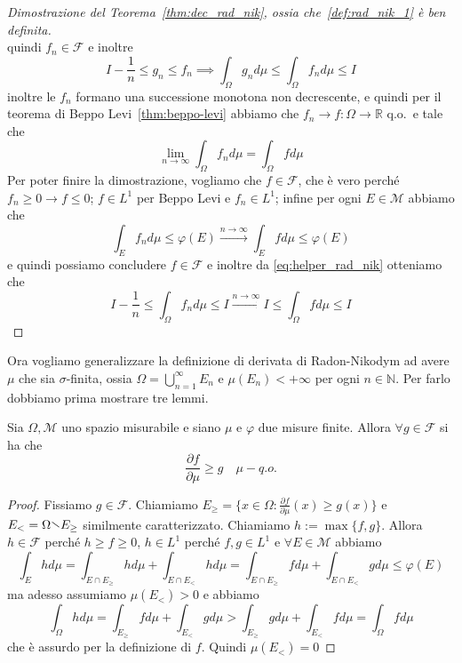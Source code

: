 \begin{proof}[Dimostrazione del Teorema~\ref{thm:dec_rad_nik}, ossia
    che~\ref{def:rad_nik_1} è ben definita]
\[    \]
    quindi \(f_{n} \in \mathcal{F}\) e inoltre 
    \begin{equation}\label{eq:helper_rad_nik}
        I - \frac{1}{n} \le g_{n} \le f_{n} \implies \int_\Omega g_{n} d\mu \le \int_\Omega f_{n}
        d\mu \le I
    \end{equation}
    inoltre le \(f_{n}\) formano una successione monotona non decrescente, e
    quindi per il teorema di Beppo Levi~\ref{thm:beppo-levi} abbiamo che \(f_{n}
    \to f : \Omega \to \mathbb{R}\) q.o.~e tale che 
    \[
        \lim_{n \to \infty} \int_\Omega f_{n} d\mu = \int_\Omega f d\mu
    \]
    Per poter finire la dimostrazione, vogliamo che \(f \in \mathcal{F}\), che è
    vero perché \(f_{n} \ge 0 \to f \le 0\); \(f \in L^{1}\) per Beppo Levi e
    \(f_{n} \in L^{1}\); infine per ogni \(E \in \mathcal{M}\) abbiamo che
    \[
        \int_E f_{n} d\mu \le \varphi {(E)} \overset{n \to
        \infty}{\longrightarrow} \int_E f d\mu \le \varphi {(E)}
    \]
    e quindi possiamo concludere \(f \in \mathcal{F}\) e inoltre da
    \eqref{eq:helper_rad_nik} otteniamo che
    \[
        I - \frac{1}{n} \le \int_\Omega f_{n} d\mu \le I
        \overset{n \to \infty}{\longrightarrow}I \le \int_\Omega f d\mu \le I
    \]
\end{proof}
Ora vogliamo generalizzare la definizione di derivata di Radon-Nikodym ad avere
\(\mu\) che sia \(\sigma\)-finita, ossia \(\Omega = \bigcup_{n=1}^{\infty}
E_{n}\) e \(\mu(E_{n}) < +\infty\) per ogni \(n \in \mathbb{N}\). Per farlo
dobbiamo prima mostrare tre lemmi.
\begin{lemma}\label{lem:rad_nik_1}
    Sia \(\Omega, \mathcal{M}\) uno spazio misurabile e siano \(\mu\) e
    \(\varphi \) due misure finite. Allora \(\forall g \in \mathcal{F}\) si ha
    che
    \[
        \frac{\partial f}{\partial \mu} \ge g \quad \mu-q.o.
    \]
\end{lemma}
\begin{proof}
    Fissiamo \(g \in \mathcal{F}\). Chiamiamo \(E_{\ge } = \{x \in \Omega :
    \frac{\partial f}{\partial \mu} {(x )} \ge g{(x)}\} \) e \(E_< = \Omega
    \sminus E_{\ge }  \) similmente caratterizzato. Chiamiamo \(h := \max \{f,
    g\} \). Allora \(h \in \mathcal{F}\) perché \(h \ge f\ge 0\), \(h \in
    L^{1}\) perché \(f, g \in L^{1}\) e \(\forall E \in \mathcal{M}\) abbiamo
    \[
        \int_E h d\mu = \int_{E \cap E_{\ge }} h d\mu + \int_{E \cap E_{<}} h
        d\mu = \int_{E \cap E_{\ge }} f d\mu + \int_{E \cap E_{<}} g d\mu \le \varphi
        {(E)}
    \]
    ma adesso assumiamo \(\mu{(E_<)} > 0\) e abbiamo
    \[
        \int_\Omega h d\mu = \int_{E_{\ge }} f d\mu + \int_{E_{<}} g d\mu >
        \int_{E_{\ge } } g d\mu + \int_{E_{<}} f d\mu = \int_\Omega f d\mu
    \]
    che è assurdo per la definizione di \(f\). Quindi \(\mu{(E_<)} = 0\)
\end{proof}

